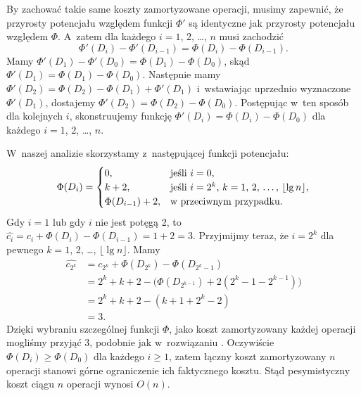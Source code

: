 
\exercise %
By zachować takie same koszty zamortyzowane operacji, musimy zapewnić, że przyrosty potencjału względem funkcji $\Phi'$ są identyczne jak przyrosty potencjału względem $\Phi$.
A~zatem dla każdego $i=1$, 2, \dots, $n$ musi zachodzić
\[
	\Phi'(D_i)-\Phi'(D_{i-1}) = \Phi(D_i)-\Phi(D_{i-1}).
\]
Mamy $\Phi'(D_1)-\Phi'(D_0)=\Phi(D_1)-\Phi(D_0)$, skąd $\Phi'(D_1)=\Phi(D_1)-\Phi(D_0)$.
Następnie mamy $\Phi'(D_2)=\Phi(D_2)-\Phi(D_1)+\Phi'(D_1)$ i~wstawiając uprzednio wyznaczone $\Phi'(D_1)$, dostajemy $\Phi'(D_2)=\Phi(D_2)-\Phi(D_0)$.
Postępując w~ten sposób dla kolejnych $i$, skonstruujemy funkcję $\Phi'(D_i)=\Phi(D_i)-\Phi(D_0)$ dla każdego $i=1$, 2, \dots, $n$.

\exercise %
W~naszej analizie skorzystamy z~następującej funkcji potencjału:
\[
	\Phi(D_i) = \begin{cases}
		0, & \text{jeśli $i=0$}, \\
		k+2, & \text{jeśli $i=2^k$, $k=1$, 2, \dots, $\lfloor\lg n\rfloor$}, \\
		\Phi(D_{i-1})+2, & \text{w~przeciwnym przypadku}.
	\end{cases}
\]
Gdy $i=1$ lub gdy $i$ nie jest potęgą 2, to $\widehat{c_i}=c_i+\Phi(D_i)-\Phi(D_{i-1})=1+2=3$.
Przyjmijmy teraz, że $i=2^k$ dla pewnego $k=1$, 2, \dots, $\lfloor\lg n\rfloor$.
Mamy
\begin{align*}
	\widehat{c_{2^k}} &= c_{2^k}+\Phi(D_{2^k})-\Phi(D_{2^k-1}) \\
	&= 2^k+k+2-\bigl(\Phi(D_{2^{k-1}})+2(2^k-1-2^{k-1})\bigr) \\
	&= 2^k+k+2-(k+1+2^k-2) \\
	&= 3.
\end{align*}
Dzięki wybraniu szczególnej funkcji $\Phi$, jako koszt zamortyzowany każdej operacji mogliśmy przyjąć 3, podobnie jak w~rozwiązaniu .
Oczywiście $\Phi(D_i)\ge\Phi(D_0)$ dla każdego $i\ge1$, zatem łączny koszt zamortyzowany $n$ operacji stanowi górne ograniczenie ich faktycznego kosztu.
Stąd pesymistyczny koszt ciągu $n$ operacji wynosi $O(n)$.

\exercise %
\exercise %
\exercise %
\exercise %
\exercise %
